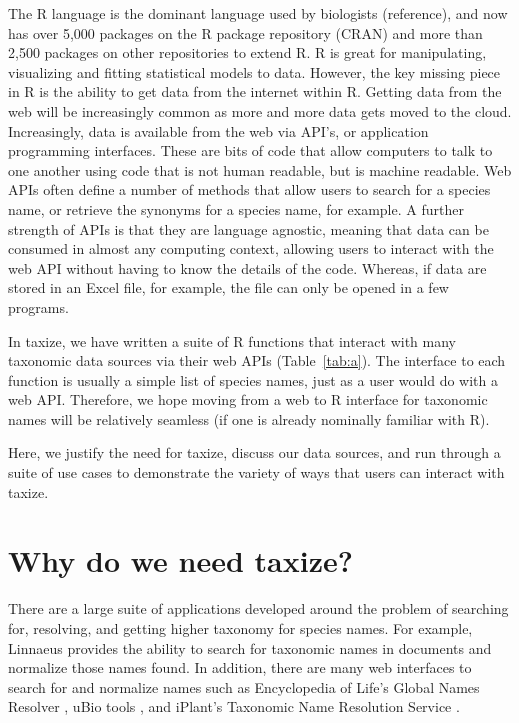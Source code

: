 \documentclass[10pt]{article}\usepackage{graphicx, color}
\begin{document}
The R language is the dominant language used by biologists (reference), and now has over 5,000 packages on the R package repository (CRAN) and more than 2,500 packages on other repositories to extend R. R is great for manipulating, visualizing and fitting statistical models to data. However, the key missing piece in R is the ability to get data from the internet within R. Getting data from the web will be increasingly common as more and more data gets moved to the cloud. Increasingly, data is available from the web via API's, or application programming interfaces. These are bits of code that allow computers to talk to one another using code that is not human readable, but is machine readable. Web APIs often define a number of methods that allow users to search for a species name, or retrieve the synonyms for a species name, for example. A further strength of APIs is that they are language agnostic, meaning that data can be consumed in almost any computing context, allowing users to interact with the web API without having to know the details of the code. Whereas, if data are stored in an Excel file, for example, the file can only be opened in a few programs. 

In taxize, we have written a suite of R functions that interact with many taxonomic data sources via their web APIs (Table~\ref{tab:a}). The interface to each function is usually a simple list of species names, just as a user would do with a web API. Therefore, we hope moving from a web to R interface for taxonomic names will be relatively seamless (if one is already nominally familiar with R). 

Here, we justify the need for taxize, discuss our data sources, and run through a suite of use cases to demonstrate the variety of ways that users can interact with taxize. 


\section*{Why do we need taxize?}

There are a large suite of applications developed around the problem of searching for, resolving, and getting higher taxonomy for species names. For example, Linnaeus \cite{linnaeus} provides the ability to search for taxonomic names in documents and normalize those names found. In addition, there are many web interfaces to search for and normalize names such as Encyclopedia of Life's Global Names Resolver \cite{eolgnr}, uBio tools \cite{ubio}, and iPlant's Taxonomic Name Resolution Service \cite{tnrs}. 
\end{document}
